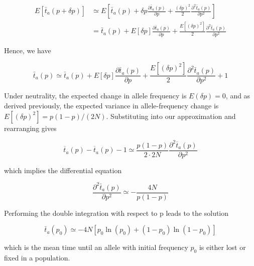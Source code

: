 \documentclass{article}
\begin{document}
\begin{equation}
\begin{align*}E[\bar{t}_{a}(p+\delta p)]&\simeq E\left[\bar{t}_{a}(p)+\delta p\frac{\partial\bar{t}_{a}(p)}{\partial p}+\frac{(\delta p)^{2}}{2}\frac{\partial^{2}\bar{t}_{a}(p)}{\partial p^{2}}\right]\\&=\bar{t}_{a}(p)+E[\delta p]\frac{\partial\bar{t}_{a}(p)}{\partial p}+\frac{E[(\delta p)^{2}]}{2}\frac{\partial^{2}\bar{t}_{a}(p)}{\partial p^{2}}\end{align*}
\end{equation}

Hence, we have

\begin{equation}
\bar{t}_{a}(p)\simeq\bar{t}_{a}(p)+E[\delta p]\frac{\partial\bar{t}_{a}(p)}{\partial p}+\frac{E[(\delta p)^{2}]}{2}\frac{\partial^{2}\bar{t}_{a}(p)}{\partial p^{2}}+1
\end{equation}

Under neutrality, the expected change in allele frequency is  $ E(\delta p) = 0 $, and as derived previously, the expected variance in allele-frequency change is  $ E[(\delta p)^2] = p(1 - p)/(2N) $. Substituting into our approximation and rearranging gives

\begin{equation}
\overline{t}_{a}(p)-\overline{t}_{a}(p)-1\simeq\frac{p(1-p)}{2\cdot2N}\frac{\partial^{2}\overline{t}_{a}(p)}{\partial p^{2}}
\end{equation}

which implies the differential equation

\begin{equation}
\frac{\partial^{2}\bar{t}_{a}(p)}{\partial p^{2}}\simeq-\frac{4N}{p(1-p)}
\end{equation}

Performing the double integration with respect to p leads to the solution

\begin{equation}
\bar{t}_{a}(p_{0})\simeq-4N[p_{0}\ln(p_{0})+(1-p_{0})\ln(1-p_{0})]
\tag{2.11a}
\label{eq:2_11a}
\end{equation}

which is the mean time until an allele with initial frequency  $ p_{0} $ is either lost or fixed in a population.
\end{document}
